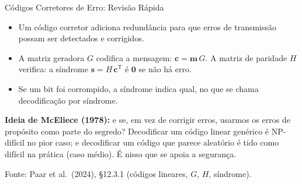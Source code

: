 \documentclass{beamer}
\begin{document}
\begin{frame}{Códigos Corretores de Erro: Revisão Rápida}
    \begin{itemize}
        \footnotesize
        \item Um código corretor adiciona redundância para que erros de transmissão possam ser detectados e corrigidos.
        \item A matriz geradora $G$ codifica a mensagem: $\mathbf{c} = \mathbf{m}\,G$. A matriz de paridade $H$ verifica: a síndrome $\mathbf{s} = H\,\mathbf{c}^{\mathsf T}$ é $\mathbf{0}$ se não há erro.
        \item Se um bit foi corrompido, a síndrome indica qual, no que se chama decodificação por síndrome.
    \end{itemize}
    \medskip
    \begin{tcolorbox}[colback=gray!8,colframe=gray!60!black,boxrule=0.5pt]
        \footnotesize
        \textbf{Ideia de McEliece (1978):} e se, em vez de corrigir erros, usarmos os erros de propósito como parte do segredo? Decodificar um código linear genérico é NP-difícil no pior caso; e decodificar um código que parece aleatório é tido como difícil na prática (caso médio). É nisso que se apoia a segurança.
    \end{tcolorbox}
    \smallskip
    {\tiny Fonte: Paar et al.\ (2024), §12.3.1 (códigos lineares, $G$, $H$, síndrome).}
\end{frame}
\end{document}
